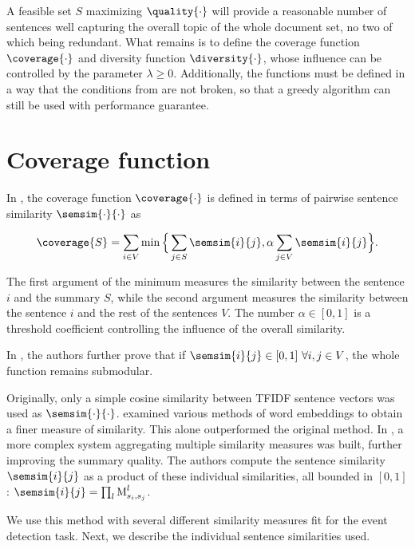 A feasible set $S$ maximizing $\quality{\cdot}$ will provide a reasonable number of sentences well capturing the overall topic of the whole document set, no two of which being redundant. What remains is to define the coverage function $\coverage{\cdot}$ and diversity function $\diversity{\cdot}$, whose influence can be controlled by the parameter $\lambda \geq 0$. Additionally, the functions must be defined in a way that the conditions from \cite{multi-summarization-1} are not broken, so that a greedy algorithm can still be used with performance guarantee.


\section{Coverage function}

In \cite{multi-summarization-2}, the coverage function $\coverage{\cdot}$ is defined in terms of pairwise sentence similarity $\semsim{\cdot}{\cdot}$ as

\begin{equation}
\coverage{S} = \sum_{i \in V}{\min{\Big\{ \sum_{j \in S}{\semsim{i}{j}}, \alpha \sum_{j \in V}{\semsim{i}{j}} \Big\} }}.
\end{equation}

The first argument of the minimum measures the similarity between the sentence $i$ and the summary $S$, while the second argument measures the similarity between the sentence $i$ and the rest of the sentences $V$. The number $\alpha \in [0,1]$ is a threshold coefficient controlling the influence of the overall similarity.

In \cite{multi-summarization-1}, the authors further prove that if $\semsim{i}{j} \in [0,1]\ \forall i, j \in V$, the whole function remains submodular.

Originally, only a simple cosine similarity between TFIDF sentence vectors \citep{information-retrieval} was used as $\semsim{\cdot}{\cdot}$. \cite{mogren-1} examined various methods of word embeddings to obtain a finer measure of similarity. This alone outperformed the original method. In \cite{mogren-2}, a more complex system aggregating multiple similarity measures was built, further improving the summary quality. The authors compute the sentence similarity $\semsim{i}{j}$ as a product of these individual similarities, all bounded in $[0, 1]$: $\semsim{i}{j} = \prod_{l}{\similarity_{s_{i}, s_{j}}^{l}}$.

We use this method with several different similarity measures fit for the event detection task. Next, we describe the individual sentence similarities used.

